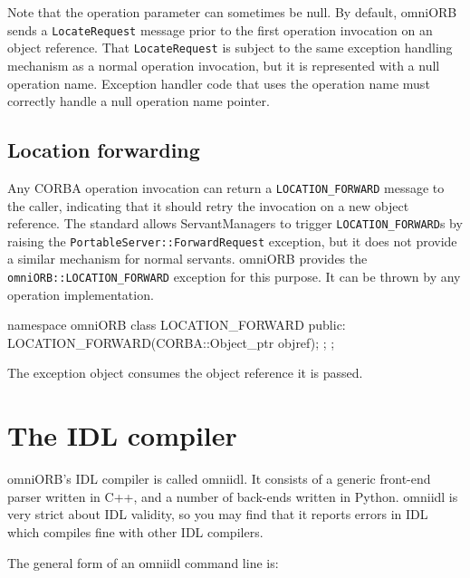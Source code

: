 \documentclass[11pt,oneside,a4paper]{book}
\newcommand{\code}[1]{\texttt{#1}}
\newcommand{\dsc}{\discretionary{}{}{}}
\begin{document}
Note that the operation parameter can sometimes be null. By default,
omniORB sends a \code{LocateRequest} message prior to the first
operation invocation on an object reference. That \code{LocateRequest}
is subject to the same exception handling mechanism as a normal
operation invocation, but it is represented with a null operation
name. Exception handler code that uses the operation name must
correctly handle a null operation name pointer.



\section{Location forwarding}
\label{sec:locationForward}

Any CORBA operation invocation can return a \code{LOCATION\_FORWARD}
message to the caller, indicating that it should retry the invocation
on a new object reference. The standard allows ServantManagers to
trigger \code{LOCATION\_FORWARD}s by raising the
\code{PortableServer::ForwardRequest} exception, but it does not
provide a similar mechanism for normal servants. omniORB provides the
\code{omniORB::\dsc{}LOCATION\_FORWARD} exception for this purpose. It
can be thrown by any operation implementation.

\begin{cxxlisting}
namespace omniORB {
  class LOCATION_FORWARD {
  public:
    LOCATION_FORWARD(CORBA::Object_ptr objref);
  };
};
\end{cxxlisting}

\noindent The exception object consumes the object reference it is
passed.





\chapter{The IDL compiler}
\label{chap:omniidl}

omniORB's IDL compiler is called omniidl. It consists of a generic
front-end parser written in C++, and a number of back-ends written in
Python. omniidl is very strict about IDL validity, so you may find
that it reports errors in IDL which compiles fine with other IDL
compilers.

The general form of an omniidl command line is:
\end{document}
